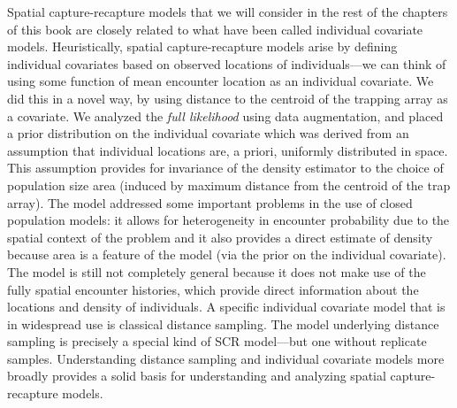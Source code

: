 Spatial capture-recapture models that we will consider in the rest of
the chapters of this book are closely related to what have been called
individual covariate models. Heuristically, spatial capture-recapture
models arise by defining individual covariates based on observed
locations of individuals---we can think of using some function of
mean encounter location as an individual covariate. We did this in a
novel way, by using distance to the centroid of the trapping array as
a covariate. We analyzed the {\it full likelihood} using data
augmentation, and placed a prior distribution on the individual
covariate which was derived from an assumption that individual
locations are, a priori, uniformly distributed in space. This
assumption provides for invariance of the density estimator to the
choice of population size area (induced by maximum distance from the
centroid of the trap array). The model addressed some important problems in the
use of closed population models: it allows for heterogeneity in
encounter probability due to the spatial context of the problem and it
also provides a direct estimate of density because area is a feature
of the model (via the prior on the individual covariate). The model is
still not completely general because it does not make use of
the fully spatial encounter histories, which provide direct
information about the locations and density of individuals.  A
specific individual covariate model that is in widespread use is
classical distance sampling. The model underlying distance
sampling is precisely a special kind of SCR model---but one without
replicate samples. Understanding distance sampling and individual
covariate models more broadly provides a solid basis for understanding
and analyzing spatial capture-recapture models.

